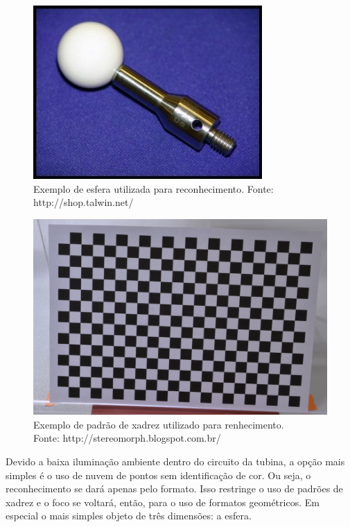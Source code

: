 \begin{figure}[h!]
   \centering
   \includegraphics[width=0.95\columnwidth]{detail/figs/localizacao/sphere_rec}
   \caption{Exemplo de esfera utilizada para reconhecimento. Fonte:
   http://shop.talwin.net/}
   \label{fig::sphere_rec}
\end{figure}



\begin{figure}[h!]
   \centering
   \includegraphics[width=0.95\columnwidth]{detail/figs/localizacao/checkerboard_rec}
   \caption{Exemplo de padrão de xadrez utilizado para renhecimento.\\ Fonte:
   http://stereomorph.blogspot.com.br/}
   \label{fig::checkerboard_rec}
\end{figure}


Devido a baixa iluminação ambiente dentro do circui\-to da tubina, a opção
mais simples é o uso de nu\-vem de pontos sem identificação de cor. Ou seja, o
reconhecimento se dará apenas pelo formato. Isso restringe o uso de padrões de
xadrez e o foco se voltará, então, para o uso de formatos geométricos. Em
especial o mais simples objeto de três dimensões: a esfera.


